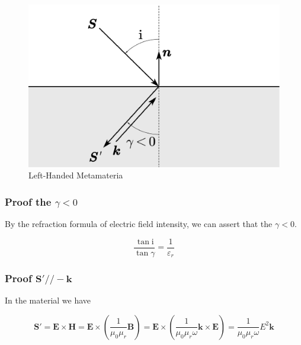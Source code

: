 \documentclass[a4paper,11pt]{amsart}
\theoremstyle{definition}
\begin{document}
	\begin{figure}[h]
		\centering
		\includegraphics[width=0.5\linewidth]{handed}
		\caption*{Left-Handed Metamateria}
		\label{fig:handed}
	\end{figure}
	
	\subsubsection*{Proof the $\gamma<0$}
	
	By the refraction formula of electric field intensity, we can assert that the $\gamma<0.$
	
	$$
	\frac{\tan  \mathrm{i}}{\tan \gamma}=\frac{1}{\varepsilon _r}
	$$
	
	\subsubsection*{Proof $\bm{S'}//-\bm{k}$}
	
	In the material we have
	
	$$
	\bm{S'}=\bm{E}\times \bm{H}=\bm{E}\times\left( \dfrac{1}{\mu_0\mu_{r}}\bm{B}\right) =\bm{E}\times\left( \dfrac{1}{\mu_0\mu_{r}\omega}\bm{k}\times \bm{E}\right)=\frac{1}{\mu _0\mu _r\omega}E^2\boldsymbol{k}
	$$
	
\end{document}
